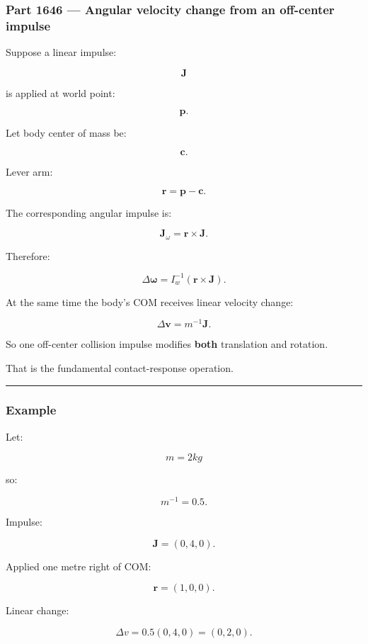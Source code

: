 \subsubsection{Part 1646 --- Angular velocity change from an off-center impulse}\label{part-1646-angular-velocity-change-from-an-off-center-impulse}

Suppose a linear impulse:

\[
\mathbf J
\]

is applied at world point:

\[
\mathbf p.
\]

Let body center of mass be:

\[
\mathbf c.
\]

Lever arm:

\[
\mathbf r
=
\mathbf p-\mathbf c.
\]

The corresponding angular impulse is:

\[
\boxed{
\mathbf J_\omega
=
\mathbf r\times\mathbf J.
}
\]

Therefore:

\[
\boxed{
\Delta\boldsymbol\omega
=
I_w^{-1}
(
\mathbf r\times\mathbf J
).
}
\]

At the same time the body's COM receives linear velocity change:

\[
\boxed{
\Delta\mathbf v
=
m^{-1}\mathbf J.
}
\]

So one off-center collision impulse modifies \textbf{both} translation and rotation.

That is the fundamental contact-response operation.

\begin{center}\rule{0.5\linewidth}{0.5pt}\end{center}

\subsubsection{Example}\label{example}

Let:

\[
m=2kg
\]

so:

\[
m^{-1}=0.5.
\]

Impulse:

\[
\mathbf J=(0,4,0).
\]

Applied one metre right of COM:

\[
\mathbf r=(1,0,0).
\]

Linear change:

\[
\Delta v
=
0.5(0,4,0)
=
(0,2,0).
\]

